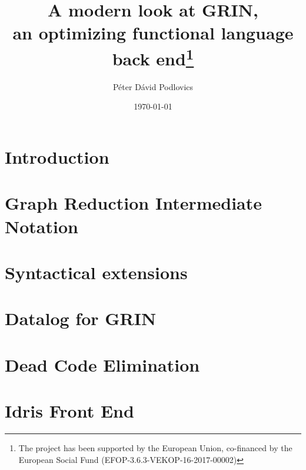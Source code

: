 \documentclass[a4paper]{report}
\begin{document}
	
	\title{A modern look at GRIN,\\ an optimizing functional language back end\thanks{ The project has been supported by the European Union, co-financed by the European Social Fund (EFOP-3.6.3-VEKOP-16-2017-00002)}}
	

	\date{\today}
	\author
	{ 
		Péter Dávid Podlovics
	}
	
	\maketitle
	
	\tableofcontents
	
	\chapter{Introduction} \label{chap:intro}
	
	
	\chapter{Graph Reduction Intermediate Notation} \label{chap:grin}
	
	
	\chapter{Syntactical extensions} \label{chap:extended-syntax}
	
	
	\chapter{Datalog for GRIN} \label{chap:datalog-grin}
	
	
	\chapter{Dead Code Elimination} \label{chap:dce}
	
	
	\chapter{Idris Front End} \label{chap:idris-front-end}
	
	
\end{document}
